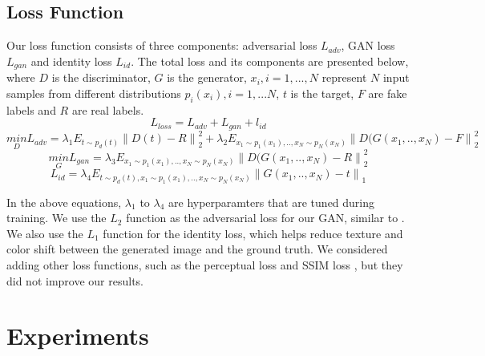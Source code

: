 \documentclass[11pt]{article}
\begin{document}
\subsection{Loss Function}
Our loss function consists of three components: adversarial loss $L_{adv}$, GAN loss $L_{gan}$ and identity loss $L_{id}$. The total loss and its components are presented below, where $D$ is the discriminator, $G$ is the generator, $x_{i}, i=1,...,N$ represent $N$ input samples from different distributions $p_{i}(x_{i}), i=1,...N$, $t$ is the target, $F$ are fake labels and $R$ are real labels.
\begin{equation}
    \mathit{L_{loss}} = \mathit{L_{adv}} + \mathit{L_{gan}} + \mathit{l_{id}}
    \label{eq:4}
\end{equation}
\begin{equation}
    \underset{D}{\mathit{min}}\mathit{L_{adv}} = \lambda_{1}E_{t\sim p_{d}(t)}{\left \| D(t)-R \right \|_{2}^{2}} + \lambda_{2}E_{x_{1}\sim p_{1}(x_{1}),..,x_{N}\sim p_{N}(x_{N})}{\left \| D(G(x_{1},..,x_{N})-F \right \|_{2}^{2}}
    \label{eq:1}
\end{equation}
\begin{equation}
    \underset{G}{\mathit{min}}\mathit{L_{gan}} = \lambda_{3}E_{x_{1}\sim p_{1}(x_{1}),..,x_{N}\sim p_{N}(x_{N})}{\left \| D(G(x_{1},..,x_{N})-R \right \|_{2}^{2}}
    \label{eq:2}
\end{equation}
\begin{equation}
    L_{id}=\lambda_{4}E_{t\sim p_{d}(t),x_{1}\sim p_{1}(x_{1}),..,x_{N}\sim p_{N}(x_{N})}{\left \| G(x_{1},..,x_{N})-t \right \|_{1}}
    \label{eq:3}
\end{equation}

In the above equations, 
$\lambda_{1}$ to $\lambda_{4}$ are hyperparamters that are tuned during training.
We use the $L_{2}$ function as the adversarial loss for our GAN, similar to \citet{LSGAN}.
We also use the $L_{1}$ function for the identity loss, which helps reduce texture and color shift between the generated image and the ground truth. 
We considered adding other loss functions, such as the perceptual loss \citet{Perceptual-loss} and SSIM loss \citet{SSIM}, but they did not improve our results.  



\section{Experiments}
\end{document}
